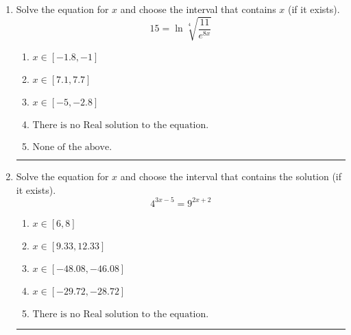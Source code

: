 \documentclass[14pt]{extbook}
\newcommand{\litem}[1]{\item#1\hspace*{-1cm}\rule{\textwidth}{0.4pt}}
\begin{document}
\begin{enumerate}
{\begin{enumerate}[label=\Alph*.]
\end{enumerate} }
\litem{
 Solve the equation for $x$ and choose the interval that contains $x$ (if it exists).\[  15 = \ln{\sqrt[4]{\frac{11}{e^{8x}}}} \]\begin{enumerate}[label=\Alph*.]
\item \( x \in [-1.8, -1] \)
\item \( x \in [7.1, 7.7] \)
\item \( x \in [-5, -2.8] \)
\item \( \text{There is no Real solution to the equation.} \)
\item \( \text{None of the above.} \)

\end{enumerate} }
\litem{
Solve the equation for $x$ and choose the interval that contains the solution (if it exists).\[ 4^{3x-5} = 9^{2x+2} \]\begin{enumerate}[label=\Alph*.]
\item \( x \in [6, 8] \)
\item \( x \in [9.33, 12.33] \)
\item \( x \in [-48.08, -46.08] \)
\item \( x \in [-29.72, -28.72] \)
\item \( \text{There is no Real solution to the equation.} \)

\end{enumerate} }
\end{enumerate}
\end{document}
